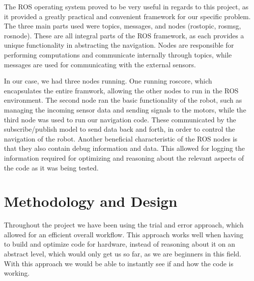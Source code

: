 \documentclass[conference]{IEEEtran}
\begin{document}
The ROS operating system proved to be very useful in regards to this project, as it provided a greatly practical and convenient framework for our specific problem.
The three main parts used were topics, messages, and nodes (rostopic, rosmsg, rosnode). These are all integral parts of the ROS framework, as each provides a unique functionality in abstracting the navigation.
Nodes are responsible for performing computations and communicate internally through topics, while messages are used for communicating with the external sensors.

In our case, we had three nodes running. One running roscore, which encapsulates the entire framwork, allowing the other nodes to run in the ROS environment.
The second node ran the basic functionality of the robot, such as managing the incoming sensor data and sending signals to the motors, while the third node was used to run our navigation code.
These communicated by the subscribe/publish model to send data back and forth, in order to control the navigation of the robot.
Another beneficial characteristic of the ROS nodes is that they also contain debug information and data. This allowed for logging the information required for optimizing and reasoning about the relevant aspects of the code as it was being tested.

\section{Methodology and Design}
Throughout the project we have been using the trial and error approach, which allowed for an efficient overall workflow. 
This approach works well when having to build and optimize code for hardware, instead of reasoning about it on an abstract level, which would only get us so far, as we are beginners in this field.
With this approach we would be able to instantly see if and how the code is working.
\end{document}
